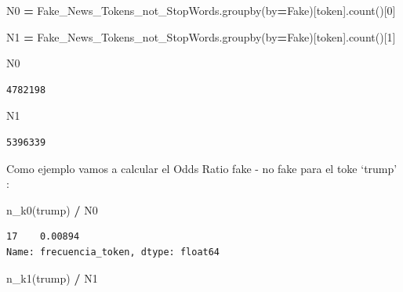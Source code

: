 \documentclass[
  11pt,
  a4paper,
]{article}
\newenvironment{Shaded}{\begin{snugshade}}{\end{snugshade}}
\newcommand{\DecValTok}[1]{\textcolor[rgb]{0.00,0.00,0.81}{#1}}
\newcommand{\NormalTok}[1]{#1}
\newcommand{\OperatorTok}[1]{\textcolor[rgb]{0.81,0.36,0.00}{\textbf{#1}}}
\newcommand{\StringTok}[1]{\textcolor[rgb]{0.31,0.60,0.02}{#1}}
\begin{document}
\begin{Shaded}
\begin{Highlighting}[]
\NormalTok{N0 }\OperatorTok{=}\NormalTok{ Fake\_News\_Tokens\_not\_StopWords.groupby(by}\OperatorTok{=}\StringTok{\textquotesingle{}Fake\textquotesingle{}}\NormalTok{)[}\StringTok{\textquotesingle{}token\textquotesingle{}}\NormalTok{].count()[}\DecValTok{0}\NormalTok{]}

\NormalTok{N1 }\OperatorTok{=}\NormalTok{ Fake\_News\_Tokens\_not\_StopWords.groupby(by}\OperatorTok{=}\StringTok{\textquotesingle{}Fake\textquotesingle{}}\NormalTok{)[}\StringTok{\textquotesingle{}token\textquotesingle{}}\NormalTok{].count()[}\DecValTok{1}\NormalTok{]}
\end{Highlighting}
\end{Shaded}

\begin{Shaded}
\begin{Highlighting}[]
\NormalTok{N0}
\end{Highlighting}
\end{Shaded}

\begin{verbatim}
4782198
\end{verbatim}

\begin{Shaded}
\begin{Highlighting}[]
\NormalTok{N1}
\end{Highlighting}
\end{Shaded}

\begin{verbatim}
5396339
\end{verbatim}

Como ejemplo vamos a calcular el Odds Ratio fake - no fake para el toke
`trump' :

\begin{Shaded}
\begin{Highlighting}[]
\NormalTok{n\_k0(}\StringTok{\textquotesingle{}trump\textquotesingle{}}\NormalTok{) }\OperatorTok{/}\NormalTok{ N0 }
\end{Highlighting}
\end{Shaded}

\begin{verbatim}
17    0.00894
Name: frecuencia_token, dtype: float64
\end{verbatim}

\begin{Shaded}
\begin{Highlighting}[]
\NormalTok{n\_k1(}\StringTok{\textquotesingle{}trump\textquotesingle{}}\NormalTok{) }\OperatorTok{/}\NormalTok{ N1}
\end{Highlighting}
\end{Shaded}
\end{document}
